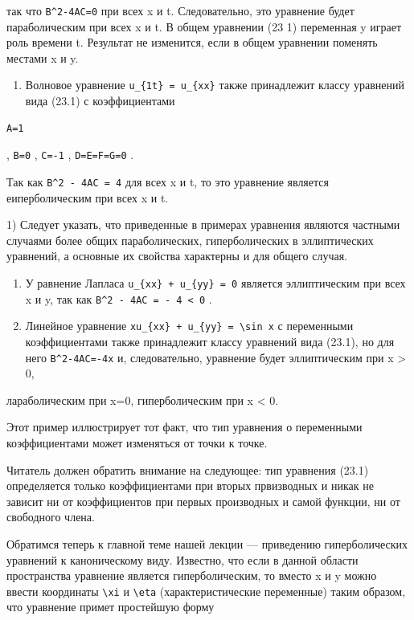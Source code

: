 \documentclass[
  ukrainian,
]{article}
\providecommand{\tightlist}{%
  \setlength{\itemsep}{0pt}\setlength{\parskip}{0pt}}
\begin{document}
так что \texttt{B\^{}2-4AC=0} при всех x и t. Следовательно, это
уравнение будет параболическим при всех x и t. В общем уравнении (23 1)
переменная y играет роль времени t. Результат не изменится, если в общем
уравнении поменять местами x и y.

\begin{enumerate}
\def\labelenumi{\arabic{enumi}.}
\setcounter{enumi}{1}
\tightlist
\item
  Волновое уравнение \texttt{u\_\{1t\}\ =\ u\_\{xx\}} также принадлежит
  классу уравнений вида (23.1) с коэффициентами
\end{enumerate}

\begin{verbatim}
A=1
\end{verbatim}

, \texttt{B=0} , \texttt{C=-1} , \texttt{D=E=F=G=0} .

Так как \texttt{B\^{}2\ -\ 4AC\ =\ 4} для всех x и t, то это уравнение
является еиперболическим при всех x и t.

1) Следует указать, что приведенные в примерах уравнения являются
частными случаями более общих параболических, гиперболических в
эллиптических уравнений, а основные их свойства характерны и для общего
случая.

\begin{enumerate}
\def\labelenumi{\arabic{enumi}.}
\setcounter{enumi}{2}
\item
  У равнение Лапласа \texttt{u\_\{xx\}\ +\ u\_\{yy\}\ =\ 0} является
  эллиптическим при всех x и y, так как
  \texttt{B\^{}2\ -\ 4AC\ =\ -\ 4\ \textless{}\ 0} .
\item
  Линейное уравнение
  \texttt{xu\_\{xx\}\ +\ u\_\{yy\}\ =\ \textbackslash{}sin\ x} с
  переменными коэффициентами также принадлежит классу уравнений вида
  (23.1), но для него \texttt{B\^{}2-4AC=-4x} и, следовательно,
  уравнение будет эллиптическим при x \textgreater{} 0,
\end{enumerate}

лараболическим при x=0, гиперболическим при x \textless{} 0.

Этот пример иллюстрирует тот факт, что тип уравнения о переменными
коэффициентами может изменяться от точки к точке.

Читатель должен обратить внимание на следующее: тип уравнения (23.1)
определяется только коэффициентами при вторых првизводных и никак не
зависит ни от коэффициентов при первых производных и самой функции, ни
от свободного члена.

Обратимся теперь к главной теме нашей лекции --- приведению
гиперболических уравнений к каноническому виду. Известно, что если в
данной области пространства уравнение является гиперболическим, то
вместо x и y можно ввести координаты \texttt{\textbackslash{}xi} и
\texttt{\textbackslash{}eta} (характеристические переменные) таким
образом, что уравнение примет простейшую форму
\end{document}
